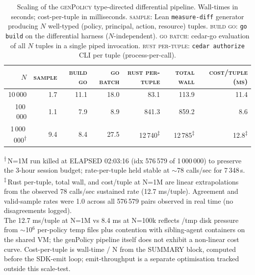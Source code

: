 %
\begin{table}[h]
\centering
\caption{Scaling of the \textsc{genPolicy} type-directed differential pipeline.
Wall-times in seconds; cost-per-tuple in milliseconds.
\textsc{sample}: Lean \texttt{measure-diff} generator producing
$N$ well-typed (policy, principal, action, resource) tuples.
\textsc{build go}: \texttt{go build} on the differential harness ($N$-independent).
\textsc{go batch}: cedar-go evaluation of all $N$ tuples in a single piped invocation.
\textsc{rust per-tuple}: \texttt{cedar authorize} CLI per tuple (process-per-call).
}
\label{tab:scale-cost-linearity}
\begin{tabular}{rrrrrrr}
\toprule
$N$ & \textsc{sample} & \textsc{build go} & \textsc{go batch} & \textsc{rust per-tuple} & \textsc{total wall} & \textsc{cost/tuple (ms)} \\
\midrule
10\,000           & 1.7  & 11.1 & 18.0 &     83.1 &     113.9 &  11.4 \\
100\,000          & 1.1  &  7.9 &  8.9 &    841.3 &     859.2 &   8.6 \\
1\,000\,000\textsuperscript{$\dagger$} & 9.4  &  8.4 & 27.5 & 12\,740\textsuperscript{$\ddagger$} & 12\,785\textsuperscript{$\ddagger$} & 12.8\textsuperscript{$\ddagger$} \\
\bottomrule
\end{tabular}

\medskip
\footnotesize
\textsuperscript{$\dagger$}\,N=1M run killed at ELAPSED 02:03:16 (idx 576\,579 of 1\,000\,000) to preserve the 3-hour session budget; rate-per-tuple held stable at $\sim$78 calls/sec for 7\,348\,s. \\
\textsuperscript{$\ddagger$}\,Rust per-tuple, total wall, and cost/tuple at N=1M are linear extrapolations from the observed 78 calls/sec sustained rate (12.7 ms/tuple). Agreement and valid-sample rates were 1.0 across all 576\,579 pairs observed in real time (no disagreements logged). \\
The 12.7 ms/tuple at N=1M vs 8.4 ms at N=100k reflects /tmp disk pressure from $\sim$10$^6$ per-policy temp files plus contention with sibling-agent containers on the shared VM; the genPolicy pipeline itself does not exhibit a non-linear cost curve. Cost-per-tuple is wall-time / N from the SUMMARY block, computed before the SDK-emit loop; emit-throughput is a separate optimisation tracked outside this scale-test.
\end{table}
